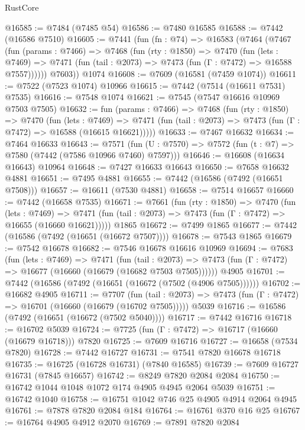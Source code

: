 \begin{lexlean}{RustCore}
\begin{coremodule}
@16585 := @7484 (@7485 @54)
@16586 := @7480 @16585
@16588 := @7442 (@16586 @7510)
@16605 := @7441
    (fun (fn : @74) =>
    @16583
      (@7464
        (@7467
          (fun (params : @7466) =>
          @7468
            (fun (rty : @1850) =>
            @7470
              (fun (lets : @7469) =>
              @7471 (fun (tail : @2073) => @7473 (fun (Γ : @7472) => @16588 @7557))))))
        @7603))
    @1074
@16608 := @7609 (@16581 (@7459 @1074))
@16611 := @7522 (@7523 @1074) @10966
@16615 := @7442 (@7514 (@16611 @7531) @7535)
@16616 := @7548 @1074
@16621 := @7545 (@7547 @16616 @10969 @7503 @7505)
@16632 := fun (params : @7466) =>
  @7468
    (fun (rty : @1850) =>
    @7470
      (fun (lets : @7469) =>
      @7471 (fun (tail : @2073) => @7473 (fun (Γ : @7472) => @16588 (@16615 @16621)))))
@16633 := @7467 @16632
@16634 := @7464 @16633
@16643 := @7571
    (fun (U : @7570) => @7572 (fun (t : @7) => @7580 (@7442 (@7586 @10966 @7460) @7597)))
@16646 := @16608 (@16634 @16643) @10964
@16648 := @7427 @16633 @16643
@16650 := @7658 @16632 @4881
@16651 := @7495 @4881
@16655 := @7442 (@16586 (@7492 (@16651 @7508)))
@16657 := @16611 (@7530 @4881)
@16658 := @7514 @16657
@16660 := @7442 (@16658 @7535)
@16671 := @7661
    (fun (rty : @1850) =>
    @7470
      (fun (lets : @7469) =>
      @7471 (fun (tail : @2073) => @7473 (fun (Γ : @7472) => @16655 (@16660 @16621)))))
    @1865
@16672 := @7499 @1865
@16677 := @7442 (@16586 (@7492 (@16651 (@16672 @7507))))
@16678 := @7543 @1865
@16679 := @7542 @16678
@16682 := @7546 @16678 @16616 @10969
@16694 := @7683
    (fun (lets : @7469) =>
    @7471
      (fun (tail : @2073) =>
      @7473 (fun (Γ : @7472) => @16677 (@16660 (@16679 (@16682 @7503 @7505))))))
    @4905
@16701 := @7442 (@16586 (@7492 (@16651 (@16672 (@7502 (@4906 @7505))))))
@16702 := @16682 @4905
@16711 := @7707
    (fun (tail : @2073) => @7473 (fun (Γ : @7472) => @16701 (@16660 (@16679 (@16702 @7505)))))
    @5039
@16716 := @16586 (@7492 (@16651 (@16672 (@7502 @5040))))
@16717 := @7442 @16716
@16718 := @16702 @5039
@16724 := @7725 (fun (Γ : @7472) => @16717 (@16660 (@16679 @16718))) @7820
@16725 := @7609 @16716
@16727 := @16658 (@7534 @7820)
@16728 := @7442 @16727
@16731 := @7541 @7820 @16678 @16718
@16735 := @16725 (@16728 @16731) (@7840 @16585)
@16739 := @7609 @16727 @16731 (@7845 @16657)
@16742 := @8249 @7820 @2084 @2084
@16750 := @16742 @1044 @1048 @1072 @174 @4905 @4945 @2064 @5039
@16751 := @16742 @1040
@16758 := @16751 @1042 @746 @25 @4905 @4914 @2064 @4945
@16761 := @7878 @7820 @2084 @184
@16764 := @16761 @370 @16 @25
@16767 := @16764 @4905 @4912 @2070
@16769 := @7891 @7820 @2084

\end{coremodule}
\end{lexlean}
